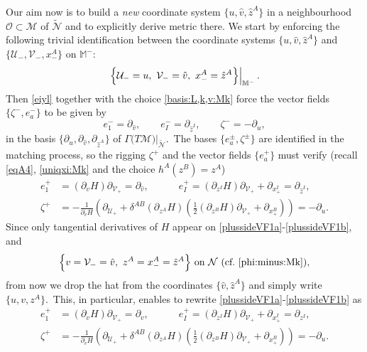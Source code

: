 \documentclass[11pt]{article}
\numberwithin{equation}{section}
\def\Mkm{\mathbb{M}^-}
\def\hatv{\hat{v}}
\def\hatz{\hat{z}}
\newcommand{\nn}{\nonumber}
\newcommand\N{\mathcal N}
\newcommand\rig{\zeta}
\newcommand{\cp}{\partial}
\newcommand{\cu}{\mathcal{U}}
\newcommand{\cv}{\mathcal{V}}
\newcommand{\ld}{\left.}
\newcommand{\rv}{\right\vert}
\newcommand{\nullhyp}{\widetilde{\N}}
\newcommand{\spc}{\textup{ }}
\begin{document}
Our aim now is to build a \textit{new} coordinate system $\{u,\hatv,\hatz^A\}$
in a neighbourhood $\mathcal{O}\subset\mathcal{M}$ of $\nullhyp$ and to explicitly derive metric there. We start by enforcing the following trivial identification between the coordinate systems 
$\{u,\hatv,\hatz^A\}$ and $\{\cu_{-},\cv_{-},x_{-}^A\}$ on $\Mkm$:
\begin{equation}
\label{minus:coords:uvz:coords}
\ld \Bigl\{\cu_-=u,\spc\cv_-=\hatv,\spc x_-^A=\hatz^A\Bigr\}\rv_{\Mkm}. 
\end{equation}
Then \eqref{eiyl} together with the choice \eqref{basis:L,k,v:Mk} force the vector fields $\{\rig^-,e_a^-\}$ to be given by 
\begin{equation}
\label{minussideVF}
e_1^-=\cp_{\hatv},\qquad e_I^-=\cp_{\hatz^I},\qquad\rig^-=-\cp_{u},
\end{equation} 
in the basis $\{\cp_{u},\cp_{\hatv},\cp_{\hatz^A}\}$ 
of $\Gamma\big( T\mathcal{M}\big)\vert_{\nullhyp}$.\ 
The bases $\{e_a^{\pm},\rig^{\pm}\}$ are identified in the matching process, so the rigging $\rig^+$ and the vector fields $\{e^+_a\}$ must verify (recall \eqref{eqA4},  \eqref{uniqxi:Mk} and the choice $h^A(z^B)=z^A$)
\begin{align}
	\label{plussideVF1a}
	e_1^+&=(\cp_{ v }H) \cp_{\cv_+}=\cp_{\hatv},\quad\qquad e_I^+=(\cp_{z^I}H) \cp_{\cv_+}+\cp_{x_+^I}=\cp_{\hatz^I},\\
	\label{plussideVF1b}\rig^+&= -\frac{1}{\partial_{ v } H} \left (
	\cp_{\cu_+} +  \delta^{AB} (\partial_{z^A} H)  \left ( \frac{1}{2}  (\partial_{z^B} H )  \cp_{\cv_+}
	+ \cp_{x_+^B} \right ) \right )=-\cp_{u}.
\end{align}
Since only tangential derivatives of  
$H$ appear on \eqref{plussideVF1a}-\eqref{plussideVF1b}, and 
\begin{equation}
\nn \Bigl\{ v=\cv_-=\hatv,\spc z^A=x_-^A=\hatz^A\Bigr\}\text{ on $\N$ (cf.\ \eqref{phi:minus:Mk}),}
\end{equation}
from now we drop the hat from the coordinates 
$\{\hatv,\hatz^A\}$
and simply write $\{u,v,z^A\}$.\ This, in particular, enables to rewrite  
\eqref{plussideVF1a}-\eqref{plussideVF1b} as
\begin{align}
\label{plussideVF2a}
e_1^+&=(\cp_{v}H) \cp_{\cv_+}=\cp_v,\quad\qquad e_I^+=(\cp_{z^I}H) \cp_{\cv_+}+\cp_{x_+^I}=\cp_{z^I},\\
\label{plussideVF2b}\rig^+&=  -\frac{1}{\partial_{v} H} \left (
\cp_{\cu_+} +  \delta^{AB} (\partial_{z^A} H)  \left ( \frac{1}{2}  (\partial_{z^B} H )  \cp_{\cv_+}
+ \cp_{x_+^B} \right ) \right )=-\cp_{u}.
\end{align}
\end{document}
